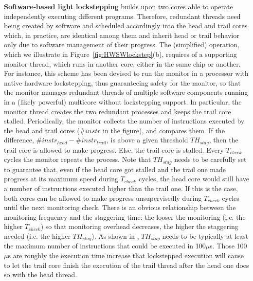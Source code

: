 \textbf{Software-based light lockstepping} builds upon two cores able to operate independently executing different programs. Therefore, redundant threads need being created by software and scheduled accordingly into the head and trail cores which, in practice, are identical among them and inherit head or trail behavior only due to software management of their progress. The (simplified) operation, which we illustrate in Figure~\ref{fig:HWSWlockstep}(b), requires of a supporting monitor thread, which runs in another core, either in the same chip or another. For instance, this scheme has been devised to run the monitor in a processor with native hardware lockstepping, thus guaranteeing safety for the monitor, so that the monitor manages redundant threads of multiple software components running in a (likely powerful) multicore without lockstepping support. In particular, the monitor thread creates the two redundant processes and keeps the trail core stalled. Periodically, the monitor collects the number of instructions executed by the head and trail cores ($\#instr$ in the figure), and compares them. If the difference, $\#instr_{head} - \#instr_{trail}$, is above a given threshold $TH_{stag}$, then the trail core is allowed to make progress. Else, the trail core is stalled. Every $T_{check}$ cycles the monitor repeats the process. Note that $TH_{stag}$ needs to be carefully set to guarantee that, even if the head core got stalled and the trail one made progress at its maximum speed during $T_{check}$ cycles, the head core would still have a number of instructions executed higher than the trail one. If this is the case, both cores can be allowed to make progress unsupervisedly during $T_{check}$ cycles until the next monitoring check. 
There is an obvious relationship between the monitoring frequency and the staggering time: the looser the monitoring (i.e. the higher $T_{check}$) so that monitoring overhead decreases, the higher the staggering needed (i.e. the higher $TH_{stag}$). As shown in \cite{SergiDFT}, $TH_{stag}$ needs to be typically at least the maximum number of instructions that could be executed in 100$\mu$s.
Those 100$\mu$s are roughly the execution time increase that lockstepped execution will cause to let the trail core finish the execution of the trail thread after the head one does so with the head thread.


